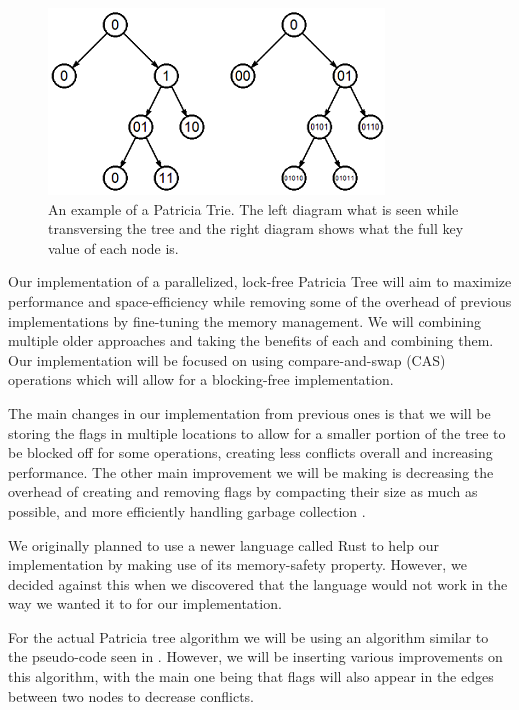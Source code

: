 \documentclass[conference]{IEEEtran}
\begin{document}
\begin{figure}[h]
\includegraphics{patriciapreview}
\caption{An example of a Patricia Trie. The left diagram what is seen while transversing the tree and the right diagram shows what the full key value of each node is.}
\end{figure}

\par
Our implementation of a parallelized, lock-free Patricia Tree will aim to maximize performance and space-efficiency while removing some of the overhead of previous implementations by fine-tuning the memory management. We will combining multiple older approaches and taking the benefits of each and combining them. Our implementation will be focused on using compare-and-swap (CAS) operations which will allow for a blocking-free implementation. \cite{Shafiei2013,Brown2014}
\par
The main changes in our implementation from previous ones is that we will be storing the flags in multiple locations to allow for a smaller portion of the tree to be blocked off for some operations, creating less conflicts overall and increasing performance. \cite{Natarajan2014} The other main improvement we will be making is decreasing the overhead of creating and removing flags by compacting their size as much as possible, and more efficiently handling garbage collection .
\par
We originally planned to use a newer language called Rust to help our implementation by making use of its memory-safety property. However, we decided against this when we discovered that the language would not work in the way we wanted it to for our implementation.
\par
For the actual Patricia tree algorithm we will be using an algorithm similar to the pseudo-code seen in \cite{Shafiei2013}. However, we will be inserting various improvements on this algorithm, with the main one being that flags will also appear in the edges between two nodes to decrease conflicts. \cite{Natarajan2014}
\end{document}
